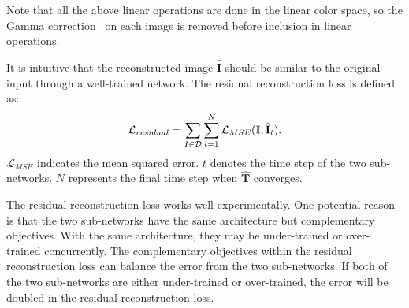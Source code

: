 \documentclass[10pt,twocolumn,letterpaper]{article}
\begin{document}
Note that all the above linear operations are done in the linear color space, so the Gamma correction~\cite{BULL201499} on each image is removed before inclusion in linear operations.

It is intuitive that the reconstructed image $\mathbf{\hat{I}}$ should be similar to the original input through a well-trained network.
The residual reconstruction loss is defined as:
\begin{equation}
\vspace{-0.2em}
\mathcal{L}_{residual}= \sum_{I\in \mathcal{D}}\sum\limits^{N}_{t = 1} \mathcal{L}_{MSE}(\mathbf{I}, \mathbf{\hat{I}}_t).
\vspace{-0.2em}
\end{equation}
$\mathcal{L}_{MSE}$ indicates the mean squared error. $t$ denotes the time step of the two sub-networks. $N$ represents the final time step when $\mathbf{\hat{T}}$ converges. 


The residual reconstruction loss works well experimentally. 
One potential reason is that the two sub-networks have the same architecture but complementary objectives. With the same architecture, they may be under-trained or over-trained concurrently. The complementary objectives within the residual reconstruction loss can balance the error from the two sub-networks. If both of the two sub-networks are either under-trained or over-trained, the error will be doubled in the residual reconstruction loss.
\end{document}
